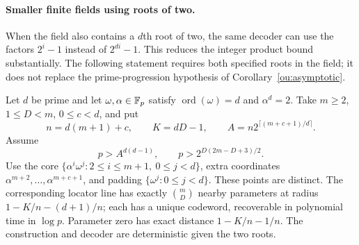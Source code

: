 \paragraph{Smaller finite fields using roots of two.}
When the field also contains a $d$th root of two, the same decoder can
use the factors $2^i-1$ instead of $2^{di}-1$. This reduces the integer
product bound substantially. The following statement requires both
specified roots in the field; it does not replace the prime-progression
hypothesis of Corollary~\ref{ou:asymptotic}.

\begin{proposition}\label{ou:kummer}
Let $d$ be prime and let $\omega,\alpha\in\mathbb F_p$ satisfy
$\operatorname{ord}(\omega)=d$ and $\alpha^d=2$.
Take $m\ge2$, $1\le D<m$, $0\le c<d$, and put
\[
 n=d(m+1)+c,\qquad K=dD-1,\qquad
 A=n2^{\lceil(m+c+1)/d\rceil}.
\]
Assume
\[
 p>A^{d(d-1)},\qquad p>2^{D(2m-D+3)/2}.
\]
Use the core $\{\alpha^i\omega^j:2\le i\le m+1,\ 0\le j<d\}$,
extra coordinates $\alpha^{m+2},\ldots,\alpha^{m+c+1}$, and padding
$\{\omega^j:0\le j<d\}$.
These points are distinct. The corresponding locator line has exactly
$\binom mD$ nearby parameters at radius $1-K/n-(d+1)/n$;
each has a unique codeword, recoverable in polynomial time in $\log p$.
Parameter zero has exact distance $1-K/n-1/n$.
The construction and decoder are deterministic given the two roots.
\end{proposition}
